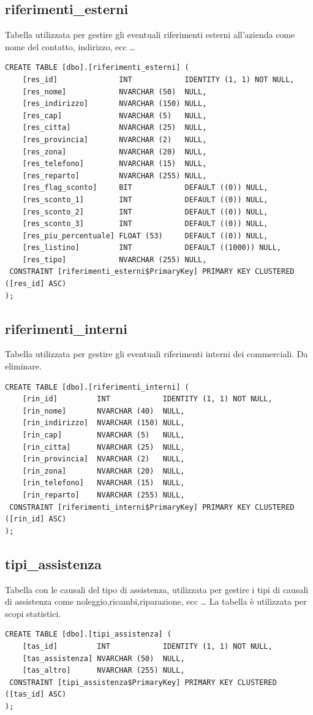 \documentclass[12pt]{article}
\begin{document}
\subsection{riferimenti\_esterni}
Tabella utilizzata per gestire gli eventuali riferimenti esterni all'azienda come nome del contatto, indirizzo, ecc \dots
\begin{lstlisting}
CREATE TABLE [dbo].[riferimenti_esterni] (
    [res_id]              INT            IDENTITY (1, 1) NOT NULL,
    [res_nome]            NVARCHAR (50)  NULL,
    [res_indirizzo]       NVARCHAR (150) NULL,
    [res_cap]             NVARCHAR (5)   NULL,
    [res_citta]           NVARCHAR (25)  NULL,
    [res_provincia]       NVARCHAR (2)   NULL,
    [res_zona]            NVARCHAR (20)  NULL,
    [res_telefono]        NVARCHAR (15)  NULL,
    [res_reparto]         NVARCHAR (255) NULL,
    [res_flag_sconto]     BIT            DEFAULT ((0)) NULL,
    [res_sconto_1]        INT            DEFAULT ((0)) NULL,
    [res_sconto_2]        INT            DEFAULT ((0)) NULL,
    [res_sconto_3]        INT            DEFAULT ((0)) NULL,
    [res_piu_percentuale] FLOAT (53)     DEFAULT ((0)) NULL,
    [res_listino]         INT            DEFAULT ((1000)) NULL,
    [res_tipo]            NVARCHAR (255) NULL,
 CONSTRAINT [riferimenti_esterni$PrimaryKey] PRIMARY KEY CLUSTERED ([res_id] ASC)
);
\end{lstlisting}

\subsection{riferimenti\_interni}
Tabella utilizzata per gestire gli eventuali riferimenti interni dei commerciali.
Da eliminare.
\begin{lstlisting}
CREATE TABLE [dbo].[riferimenti_interni] (
    [rin_id]         INT            IDENTITY (1, 1) NOT NULL,
    [rin_nome]       NVARCHAR (40)  NULL,
    [rin_indirizzo]  NVARCHAR (150) NULL,
    [rin_cap]        NVARCHAR (5)   NULL,
    [rin_citta]      NVARCHAR (25)  NULL,
    [rin_provincia]  NVARCHAR (2)   NULL,
    [rin_zona]       NVARCHAR (20)  NULL,
    [rin_telefono]   NVARCHAR (15)  NULL,
    [rin_reparto]    NVARCHAR (255) NULL,
 CONSTRAINT [riferimenti_interni$PrimaryKey] PRIMARY KEY CLUSTERED ([rin_id] ASC)
);
\end{lstlisting}

\subsection{tipi\_assistenza}
Tabella con le causali del tipo di assistenza,
utilizzata per gestire i tipi di causali di assistenza come noleggio,ricambi,riparazione, ecc \dots
La tabella è utilizzata per scopi statistici.
\begin{lstlisting}
CREATE TABLE [dbo].[tipi_assistenza] (
    [tas_id]         INT            IDENTITY (1, 1) NOT NULL,
    [tas_assistenza] NVARCHAR (50)  NULL,
    [tas_altro]      NVARCHAR (255) NULL,
 CONSTRAINT [tipi_assistenza$PrimaryKey] PRIMARY KEY CLUSTERED ([tas_id] ASC)
);
\end{lstlisting}
\end{document}
